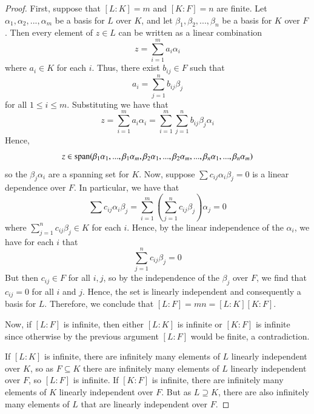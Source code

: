 \documentclass[12pt, a4paper, oneside, openright, titlepage]{book}
\begin{document}
\begin{proof}
    First, suppose that $[L:K] = m$ and $[K:F] = n$ are finite. Let $\alpha_1,\alpha_2,...,\alpha_m$ be a basis for $L$ over $K$, and let $\beta_1,\beta_2,...,\beta_n$ be a basis for $K$ over $F$. Then every element of $z \in L$ can be written as a linear combination \begin{equation*}
        z = \sum_{i=1}^ma_i\alpha_i
    \end{equation*}
    where $a_i \in K$ for each $i$. Thus, there exist $b_{ij} \in F$ such that \begin{equation*}
        a_i = \sum_{j=1}^nb_{ij}\beta_j
    \end{equation*}
    for all $1 \leq i \leq m$. Substituting we have that \begin{equation*}
        z = \sum_{i=1}^ma_i\alpha_i = \sum_{i=1}^m\sum_{j=1}^nb_{ij}\beta_j\alpha_i
    \end{equation*}
    Hence, $$z \in \operatorname{span}(\beta_1\alpha_1,...,\beta_1\alpha_m,\beta_2\alpha_1,...,\beta_2\alpha_m,...,\beta_n\alpha_1,...,\beta_n\alpha_m)$$
    so the $\beta_j\alpha_i$ are a spanning set for $K$. Now, suppose $\sum c_{ij}\alpha_i\beta_j = 0$ is a linear dependence over $F$. In particular, we have that \begin{equation*}
        \sum c_{ij}\alpha_i\beta_j = \sum_{i=1}^m\left(\sum_{j=1}^nc_{ij}\beta_j\right)\alpha_j = 0
    \end{equation*}
    where $\sum_{j=1}^nc_{ij}\beta_j \in K$ for each $i$. Hence, by the linear independence of the $\alpha_i$, we have for each $i$ that \begin{equation*}
        \sum_{j=1}^nc_{ij}\beta_j = 0
    \end{equation*}
    But then $c_{ij} \in F$ for all $i,j$, so by the independence of the $\beta_j$ over $F$, we find that $c_{ij} = 0$ for all $i$ and $j$. Hence, the set is linearly independent and consequently a basis for $L$. Therefore, we conclude that $[L:F] = mn = [L:K][K:F]$.


    Now, if $[L:F]$ is infinite, then either $[L:K]$ is infinite or $[K:F]$ is infinite since otherwise by the previous argument $[L:F]$ would be finite, a contradiction.

    If $[L:K]$ is infinite, there are infinitely many elements of $L$ linearly independent over $K$, so as $F \subseteq K$ there are infinitely many elements of $L$ linearly independent over $F$, so $[L:F]$ is infinite. If $[K:F]$ is infinite, there are infinitely many elements of $K$ linearly independent over $F$. But as $L \supseteq K$, there are also infinitely many elements of $L$ that are linearly independent over $F$.
\end{proof}
\end{document}
